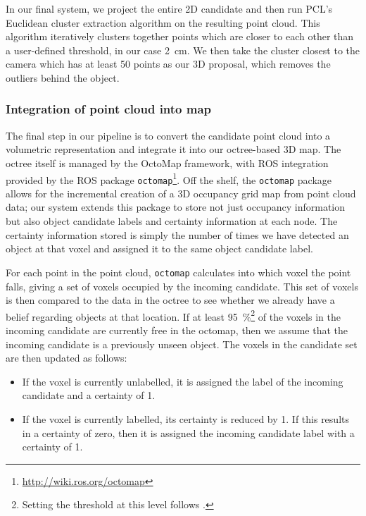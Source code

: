 In our final system, we project the entire 2D candidate and then run PCL's Euclidean cluster extraction algorithm on the resulting point cloud.
This algorithm iteratively clusters together points which are closer to each other than a user-defined threshold, in our case \SI{2}{\centi\meter}.
We then take the cluster closest to the camera which has at least \num{50} points as our 3D proposal, which removes the outliers behind the object.

\subsubsection{Integration of point cloud into map}
\label{sssec:point_cloud_into_octomap}

The final step in our pipeline is to convert the candidate point cloud into a volumetric representation and integrate it into our octree-based 3D map.
The octree itself is managed by the OctoMap framework\cite{hornung13octomap}, with ROS integration provided by the ROS package \texttt{octomap}\footnote{\url{http://wiki.ros.org/octomap}}.
Off the shelf, the \texttt{octomap} package allows for the incremental creation of a 3D occupancy grid map from point cloud data; our system extends this package to store not just occupancy information but also object candidate labels and certainty information at each node.
The certainty information stored is simply the number of times we have detected an object at that voxel and assigned it to the same object candidate label.


For each point in the point cloud, \texttt{octomap} calculates into which voxel the point falls, giving a set of voxels occupied by the incoming candidate.
This set of voxels is then compared to the data in the octree to see whether we already have a belief regarding objects at that location.
If at least \SI{95}{\percent}\footnote{Setting the threshold at this level follows \cite{garcia2013computational}.} of the voxels in the incoming candidate are currently free in the octomap, then we assume that the incoming candidate is a previously unseen object.
The voxels in the candidate set are then updated as follows:
\begin{itemize}
	\item If the voxel is currently unlabelled, it is assigned the label of the incoming candidate and a certainty of \num{1}.
	\item If the voxel is currently labelled, its certainty is reduced by \num{1}. If this results in a certainty of zero, then it is assigned the incoming candidate label with a certainty of \num{1}.
\end{itemize}

